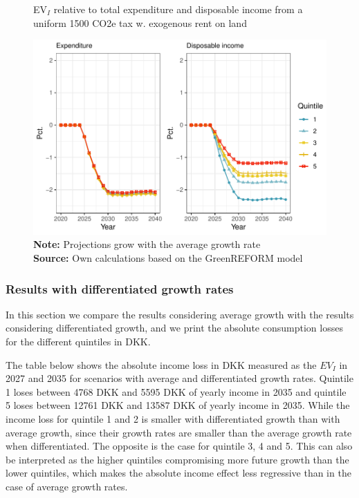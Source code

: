 \begin{figure}[H]
\centering
\caption{EV$_I$ relative to total expenditure and disposable income from a uniform 1500 CO2e tax w. exogenous rent on land}
\label{tax3_EV}
\includegraphics[width=.9\textwidth]{Figures/EV_tax3.pdf}
\captionsetup{singlelinecheck=off,size=scriptsize}
\setlength{\captionmargin}{10pt}
\caption*{
\textbf{Note:} Projections grow with the average growth rate\\
\textbf{Source:} Own calculations based on the GreenREFORM model}
\end{figure}

\subsubsection{Results with differentiated growth rates}
In this section we compare the results considering average growth with the results considering differentiated growth, and we print the absolute consumption losses for the different quintiles in DKK.

The table below shows the absolute income loss in DKK measured as the $EV_I$ in 2027 and 2035 for scenarios with average and differentiated growth rates. Quintile 1 loses between 4768 DKK and 5595 DKK of yearly income in 2035 and quintile 5 loses between 12761 DKK and 13587 DKK of yearly income in 2035. While the income loss for quintile 1 and 2 is smaller with differentiated growth than with average growth, since their growth rates are smaller than the average growth rate when differentiated. The opposite is the case for quintile 3, 4 and 5. This can also be interpreted as the higher quintiles compromising more future growth than the lower quintiles, which makes the absolute income effect less regressive than in the case of average growth rates.

